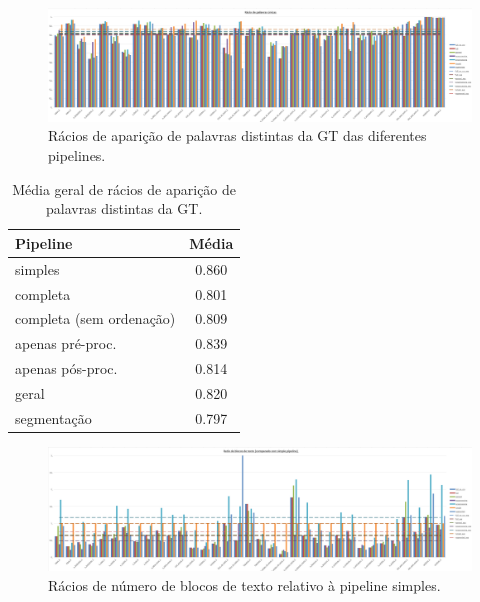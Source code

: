 \begin{figure}[H]
	\centering
	\hspace*{-2cm}
	\includegraphics[width=1.2\textwidth]{images/resultados/graph_gt_unique_word_hit_ratio.png}
	\caption{Rácios de aparição de palavras distintas da GT das diferentes pipelines.}
	\label{fig:graph_gt_unique_word_hit_ratio}
\end{figure}


\begin{table}[H]
	\centering
	\begin{tabular}{|l|c|}
		\hline
		\textbf{Pipeline} & \textbf{Média} \\ \hline
		simples & 0.860 				   \\ \hline
		completa & 0.801 				   \\ \hline
		completa (sem ordenação) & 0.809   \\ \hline
		apenas pré-proc. & 0.839 		   \\ \hline
		apenas pós-proc. & 0.814 		   \\ \hline
		geral & 0.820 					   \\ \hline
		segmentação & 0.797 			   \\ \hline
	\end{tabular}
	\caption{Média geral de rácios de aparição de palavras distintas da GT.}
\end{table}


\begin{figure}[H]
	\centering
	\hspace*{-2cm}
	\includegraphics[width=1.2\textwidth]{images/resultados/graph_text_block_ratio.png}
	\caption{Rácios de número de blocos de texto relativo à pipeline simples.}
	\label{fig:graph_text_block_ratio}
\end{figure}


